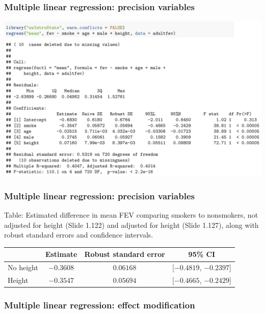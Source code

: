 \documentclass[12pt, 
hyperref={colorlinks=true, linkcolor=blue, urlcolor=cyan}]{beamer}
\begin{document}
\begin{frame}
\frametitle{Multiple linear regression: precision variables}
\begin{center}
\vspace{-1cm}\hspace*{-0.5cm}\includegraphics[width=1.1\textwidth]{plots/fev_vs_smoke_adjust_adultfev.png}
\end{center}

\end{frame}

\begin{frame}
\frametitle{Multiple linear regression: precision variables}
Table: Estimated difference in mean FEV comparing smokers to nonsmokers, not adjusted for height (Slide 1.122) and adjusted for height (Slide 1.127), along with robust standard errors and confidence intervals.

\hspace*{-1cm}\begin{tabular}{lccc}
\hline 
 & Estimate & Robust standard error & 95\% CI \\
 \hline 
No height & $-0.3608$ & $0.06168$  & [$-0.4819$, $-0.2397$]\\
Height & $-0.3547$ & $0.05694$ & [$-0.4665$, $-0.2429$]
\end{tabular}
\end{frame}

\begin{frame}
\frametitle{Multiple linear regression: effect modification}

\end{frame}

\end{document}
